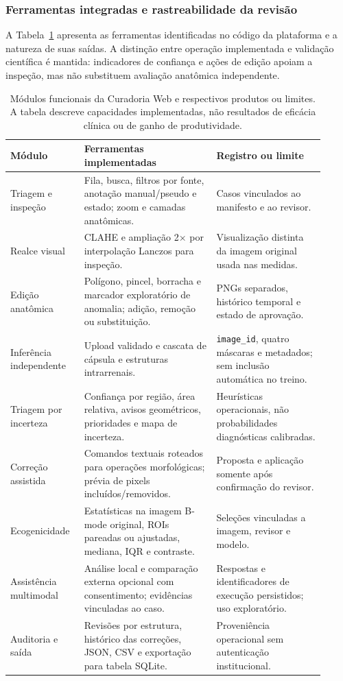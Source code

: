 \documentclass[12pt]{article}
\begin{document}
\subsubsection{Ferramentas integradas e rastreabilidade da revisão}
A Tabela~\ref{tab:curadoria_ferramentas} apresenta as ferramentas identificadas no código da plataforma e a natureza de suas saídas. A distinção entre operação implementada e validação científica é mantida: indicadores de confiança e ações de edição apoiam a inspeção, mas não substituem avaliação anatômica independente.

\begin{table}[!htbp]
\centering
\small
\caption[Funcionalidades implementadas na Curadoria Web]{Módulos funcionais da Curadoria Web e respectivos produtos ou limites. A tabela descreve capacidades implementadas, não resultados de eficácia clínica ou de ganho de produtividade.}
\label{tab:curadoria_ferramentas}
\begingroup
\setlength{\tabcolsep}{4pt}
\renewcommand{\arraystretch}{1.14}
\begin{tabular}{p{0.20\linewidth}p{0.39\linewidth}p{0.32\linewidth}}
\toprule
\textbf{Módulo} & \textbf{Ferramentas implementadas} & \textbf{Registro ou limite} \\
\midrule
Triagem e inspeção & Fila, busca, filtros por fonte, anotação manual/pseudo e estado; zoom e camadas anatômicas. & Casos vinculados ao manifesto e ao revisor. \\
Realce visual & CLAHE e ampliação 2$\times$ por interpolação Lanczos para inspeção. & Visualização distinta da imagem original usada nas medidas. \\
Edição anatômica & Polígono, pincel, borracha e marcador exploratório de anomalia; adição, remoção ou substituição. & PNGs separados, histórico temporal e estado de aprovação. \\
Inferência independente & Upload validado e cascata de cápsula e estruturas intrarrenais. & \texttt{image\_id}, quatro máscaras e metadados; sem inclusão automática no treino. \\
Triagem por incerteza & Confiança por região, área relativa, avisos geométricos, prioridades e mapa de incerteza. & Heurísticas operacionais, não probabilidades diagnósticas calibradas. \\
Correção assistida & Comandos textuais roteados para operações morfológicas; prévia de pixels incluídos/removidos. & Proposta e aplicação somente após confirmação do revisor. \\
Ecogenicidade & Estatísticas na imagem B-mode original, ROIs pareadas ou ajustadas, mediana, IQR e contraste. & Seleções vinculadas a imagem, revisor e modelo. \\
Assistência multimodal & Análise local e comparação externa opcional com consentimento; evidências vinculadas ao caso. & Respostas e identificadores de execução persistidos; uso exploratório. \\
Auditoria e saída & Revisões por estrutura, histórico das correções, JSON, CSV e exportação para tabela SQLite. & Proveniência operacional sem autenticação institucional. \\
\bottomrule
\end{tabular}
\endgroup
\end{table}
\end{document}
